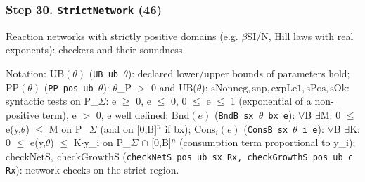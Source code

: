 \subsubsection*{Step 30. \texttt{StrictNetwork} (46)}
Reaction networks with strictly positive domains (e.g. $\beta$SI/N, Hill laws with real exponents): checkers and their soundness.

{\small\raggedright Notation: $\mathrm{UB}(\theta)$ (\texttt{UB ub $\theta$}): declared lower/upper bounds of parameters hold; $\mathrm{PP}(\theta)$ (\texttt{PP pos ub $\theta$}): $\theta$\_P $>$ 0 and UB($\theta$); $\mathrm{sNonneg},\mathrm{snp},\mathrm{expLe1},\mathrm{sPos},\mathrm{sOk}$: syntactic tests on P\_$\Sigma$: e $\ge$ 0, e $\le$ 0, 0 $\le$ e $\le$ 1 (exponential of a non-positive term), e $>$ 0, e well defined; $\mathrm{Bnd}(e)$ (\texttt{BndB sx $\theta$ bx e}): $\forall$B $\exists$M: 0 $\le$ e(y,$\theta$) $\le$ M on P\_$\Sigma$ (and on [0,B]$^n$ if bx); $\mathrm{Cons}_i(e)$ (\texttt{ConsB sx $\theta$ i e}): $\forall$B $\exists$K: 0 $\le$ e(y,$\theta$) $\le$ K$\cdot$y\_i on P\_$\Sigma$ $\cap$ [0,B]$^n$ (consumption term proportional to y\_i); $\mathrm{checkNetS},\ \mathrm{checkGrowthS}$ (\texttt{checkNetS pos ub sx Rx, checkGrowthS pos ub c Rx}): network checks on the strict region.}

